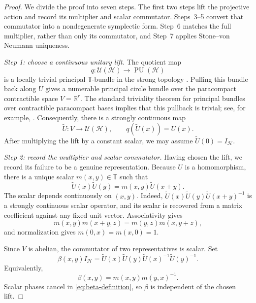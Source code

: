 \documentclass[10pt,a4paper]{amsart}
\numberwithin{equation}{section}
\newcommand{\cH}{\mathcal H}
\newcommand{\R}{\mathbb R}
\newcommand{\T}{\mathbb T}
\newcommand{\U}{\mathcal U}
\newcommand{\PU}{\operatorname{PU}}
\newcommand{\Step}[1]{\par\medskip\noindent\textit{#1.}\quad}
\begin{document}
\begin{proof}
We divide the proof into seven steps.  The first two steps lift the projective
action and record its multiplier and scalar commutator.  Steps~3--5 convert
that commutator into a nondegenerate symplectic form.  Step~6 matches the full
multiplier, rather than only its commutator, and Step~7 applies
Stone--von Neumann uniqueness.

\Step{Step 1: choose a continuous unitary lift}
The quotient map
\[
 q:\U(\cH)\longrightarrow\PU(\cH)
\]
is a locally trivial principal $\T$-bundle in the strong topology
\cite{Simms1970}.  Pulling this bundle back along $U$ gives a numerable
principal circle bundle over the paracompact contractible space $V=\R^r$.
The standard triviality theorem for principal bundles over contractible
paracompact bases implies that this pullback is trivial; see, for example,
\cite{Husemoller1994}.  Consequently, there is a strongly continuous map
\[
 \widetilde U:V\longrightarrow\U(\cH),
 \qquad q(\widetilde U(x))=U(x).
\]
After multiplying the lift by a constant scalar, we may assume
$\widetilde U(0)=I_{\cH}$.

\Step{Step 2: record the multiplier and scalar commutator}
Having chosen the lift, we record its failure to be a genuine
representation.  Because $U$ is a homomorphism, there is a unique scalar
$m(x,y)\in\T$ such
that
\begin{equation}\label{eq:lift-multiplier}
 \widetilde U(x)\widetilde U(y)=m(x,y)\widetilde U(x+y).
\end{equation}
The scalar depends continuously on $(x,y)$.  Indeed,
$\widetilde U(x)\widetilde U(y)\widetilde U(x+y)^{-1}$ is a strongly
continuous scalar operator, and its scalar is recovered from a matrix
coefficient against any fixed unit vector.  Associativity gives
\begin{equation}\label{eq:multiplier-identity}
 m(x,y)m(x+y,z)=m(y,z)m(x,y+z),
\end{equation}
and normalization gives $m(0,x)=m(x,0)=1$.

Since $V$ is abelian, the commutator of two representatives is scalar.  Set
\begin{equation}\label{eq:beta-definition}
 \beta(x,y)I_{\cH}
 =\widetilde U(x)\widetilde U(y)
  \widetilde U(x)^{-1}\widetilde U(y)^{-1}.
\end{equation}
Equivalently,
\begin{equation}\label{eq:beta-from-m}
 \beta(x,y)=m(x,y)m(y,x)^{-1}.
\end{equation}
Scalar phases cancel in \eqref{eq:beta-definition}, so $\beta$ is independent
of the chosen lift.


\end{proof}
\end{document}
